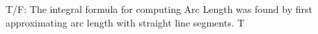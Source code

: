 {T/F: The integral formula for computing Arc Length was found by first approximating arc length with straight line segments.}
{T}
